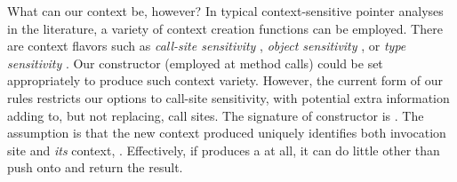 What can our context be, however? In typical context-sensitive pointer
analyses in the literature, a variety of context creation functions
can be employed. There are context flavors such as \emph{call-site
  sensitivity} \cite{col:1981:Sharir,thesis:Shivers},
\emph{object sensitivity}
\cite{issta:2002:Milanova,article:2005:Milanova}, or \emph{type
  sensitivity} \cite{popl:2011:Smaragdakis}. Our 
constructor (employed at method calls) could be set appropriately to
produce such context variety. However, the current form of our rules
restricts our options to call-site sensitivity, with potential extra
information adding to, but not replacing, call sites. The signature of
constructor  is . The assumption is that the new context produced
uniquely identifies both invocation site  and \emph{its}
context, . Effectively, if  produces a
 at all, it can do little other than push 
onto  and return the result.



